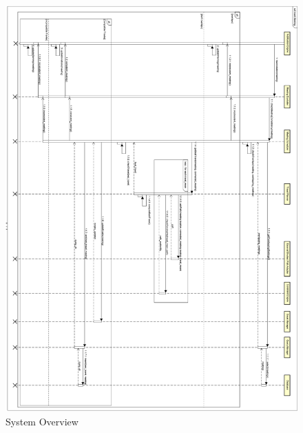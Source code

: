 
\begin{figure}[h]
	\centering\includegraphics[width = \textwidth]{Images/RuntimeDiagrams/InsertMeetingOrizzontale.png}
	\caption{System Overview}
\end{figure}

